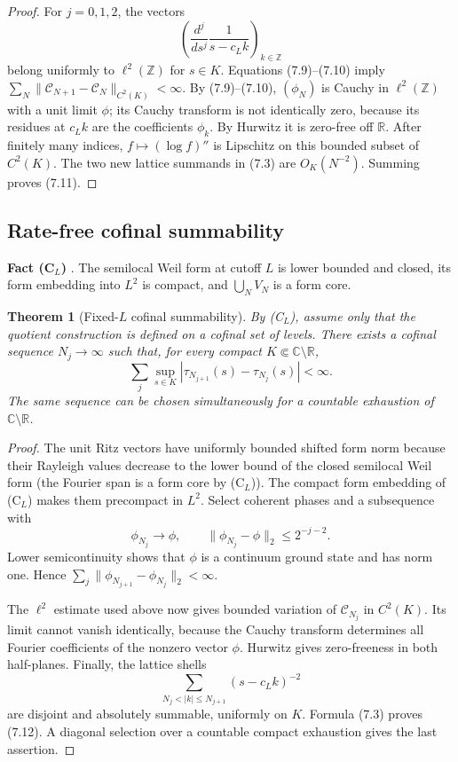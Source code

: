 \documentclass[11pt]{amsart}
\newtheorem{theorem}{Theorem}[section]
\theoremstyle{definition}
\theoremstyle{remark}
\newcommand{\C}{\mathbb C}
\newcommand{\R}{\mathbb R}
\begin{document}
\begin{proof}
For \(j=0,1,2\), the vectors
\[
 \left(\frac{d^j}{ds^j}\frac1{s-c_Lk}\right)_{k\in\mathbb Z}
\]
belong uniformly to \(\ell^2(\mathbb Z)\) for \(s\in K\).  Equations
(7.9)--(7.10) imply
\(\sum_N\|\mathcal C_{N+1}-\mathcal C_N\|_{C^2(K)}<\infty\).
By (7.9)--(7.10), \((\phi_N)\) is Cauchy in \(\ell^2(\mathbb Z)\) with a
unit limit \(\phi\); its Cauchy transform is not identically zero, because
its residues at \(c_Lk\) are the coefficients \(\phi_k\).  By Hurwitz it is
zero-free off \(\R\).  After finitely
many indices, \(f\mapsto(\log f)''\) is Lipschitz on this bounded subset of
\(C^2(K)\).  The two new lattice summands in (7.3) are \(O_K(N^{-2})\).
Summing proves (7.11).
\end{proof}

\subsection{Rate-free cofinal summability}

\textbf{Fact (C\(_L\))} \cite[Prop.~3.3, Prop.~3.4, Thm.~3.6 with Prop.~3.5]{CCM}.
The semilocal Weil form at cutoff \(L\) is lower bounded and closed, its
form embedding into \(L^2\) is compact, and \(\bigcup_NV_N\) is a form core.

\begin{theorem}[Fixed-\(L\) cofinal summability]
By \textup{(C\(_L\))}, assume only that the quotient construction is
defined on a cofinal set of levels.  There exists a cofinal sequence \(N_j\to\infty\) such that, for
every compact \(K\Subset\C\setminus\R\),
\[
\boxed{
 \sum_j\sup_{s\in K}
 |\tau_{N_{j+1}}(s)-\tau_{N_j}(s)|<\infty.}
\tag{7.12}
\]
The same sequence can be chosen simultaneously for a countable exhaustion
of \(\C\setminus\R\).
\end{theorem}

\begin{proof}
The unit Ritz vectors have uniformly bounded shifted form norm because
their Rayleigh values decrease to the lower bound of the closed semilocal
Weil form (the Fourier span is a form core by \textup{(C\(_L\))}).  The
compact form embedding of \textup{(C\(_L\))} makes them precompact in
\(L^2\).  Select coherent phases and a subsequence with
\[
 \phi_{N_j}\to\phi,\qquad
 \|\phi_{N_j}-\phi\|_2\le2^{-j-2}.
\tag{7.13}
\]
Lower semicontinuity shows that \(\phi\) is a continuum ground state and
has norm one.  Hence
\(\sum_j\|\phi_{N_{j+1}}-\phi_{N_j}\|_2<\infty\).

The \(\ell^2\) estimate used above now gives bounded variation of
\(\mathcal C_{N_j}\) in \(C^2(K)\).  Its limit cannot vanish identically,
because the Cauchy transform determines all Fourier coefficients of the
nonzero vector \(\phi\).  Hurwitz gives zero-freeness in both half-planes.
Finally, the lattice shells
\[
 \sum_{N_j<|k|\le N_{j+1}}(s-c_Lk)^{-2}
\]
are disjoint and absolutely summable, uniformly on \(K\).  Formula (7.3)
proves (7.12).  A diagonal selection over a countable compact exhaustion
gives the last assertion.
\end{proof}
\end{document}
